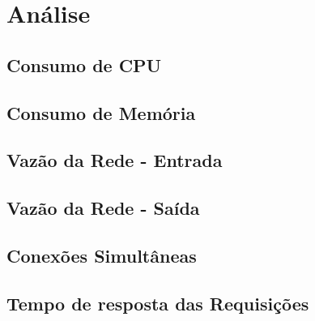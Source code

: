 \chapter{Análise}
\label{cap7}

\section{Consumo de CPU}

\section{Consumo de Memória}

\section{Vazão da Rede - Entrada}

\section{Vazão da Rede - Saída}

\section{Conexões Simultâneas}

\section{Tempo de resposta das Requisições}
